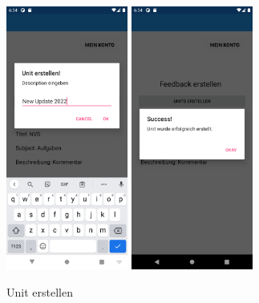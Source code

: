 \begin{figure}[h]
    \begin{center}
        \includegraphics[width=4cm]{pics/Xamarin Lehrer/7.png}\hfill
        \includegraphics[width=4cm]{pics/Xamarin Lehrer/8.png}
        \caption[HomePage Unit Ansicht]{Unit erstellen}
    \end{center}
\end{figure}
\newpage

